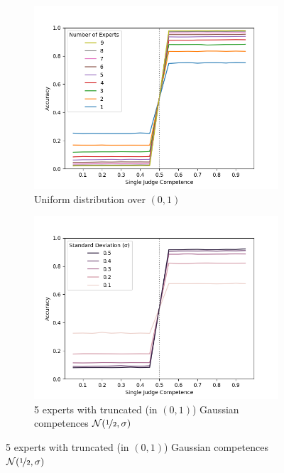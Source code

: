 \documentclass[letterpaper]{article} %
\begin{document}
\begin{figure}[t]
\centering
\begin{subfigure}{0.3\textwidth}
 \includegraphics[width=\textwidth]{./Figures/Experiment1_Uniform/Experiment1_uniform[0,1]_compare_numexperts.png}
 \caption{Uniform distribution over $(0,1)$}
\label{fig:E1_uniform_01}
\end{subfigure}
\hfill
\begin{subfigure}{0.3\textwidth}
 \includegraphics[width=\textwidth]{./Figures/Experiment1_Gaussian5/Experiment1_gaussian_5experts_(0,1)_Fig6_compare_stddevs.png}
 \caption{5 experts with truncated (in $(0,1)$) Gaussian competences $\mathcal{N}(\nicefrac{1}{2},\sigma)$}
 \label{fig:E1_gaussian_01_stddevs}

\end{subfigure}
\end{figure}
\end{document}
